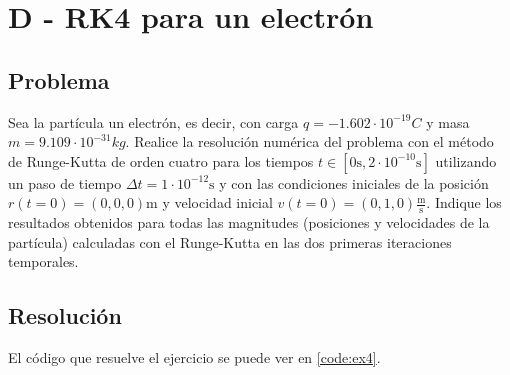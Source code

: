 \section{D - RK4 para un electrón}

\subsection{Problema}

Sea la partícula un electrón, es decir, con carga $q = -1.602 \cdot 10^{-19} C$  y masa $m = 9.109 \cdot 10^{-31} kg$. Realice la resolución numérica del problema con el método de Runge-Kutta de orden cuatro para los tiempos $t \in [0 \text{s}, 2\cdot10^{-10} \text{s} ]$ utilizando un paso de tiempo $\Delta t = 1 \cdot 10^{-12} \text{s}$ y con las condiciones iniciales de la posición $r(t = 0) = (0, 0, 0) \text{m}$ y velocidad inicial $v(t=0) = (0, 1, 0) \frac{\text{m}}{\text{s}}$.  Indique los resultados obtenidos para todas las magnitudes (posiciones y velocidades de la partícula) calculadas con el Runge-Kutta en las dos primeras iteraciones temporales.

\subsection{Resolución}

El código que resuelve el ejercicio se puede ver en \ref{code:ex4}. 
